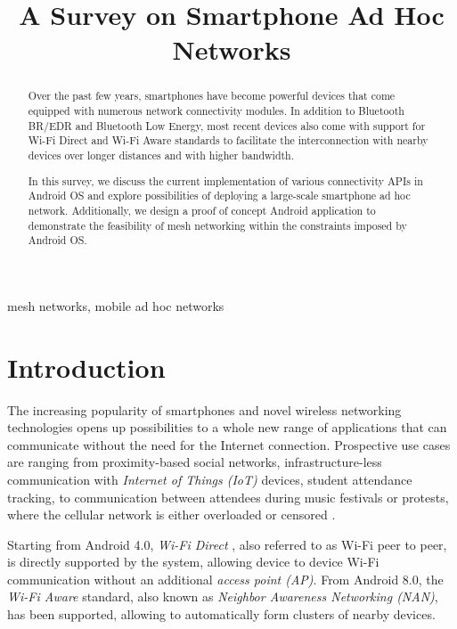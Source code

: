 \documentclass[conference,compsoc]{IEEEtran}
\begin{document}
 
\title{A Survey on Smartphone Ad Hoc Networks}

\author{
}

\maketitle

\begin{abstract}
Over the past few years, smartphones have become powerful devices that come equipped with numerous network connectivity modules. In addition to Bluetooth BR/EDR and Bluetooth Low Energy, most recent devices also come with support for Wi-Fi Direct and Wi-Fi Aware standards to facilitate the interconnection with nearby devices over longer distances and with higher bandwidth. 

In this survey, we discuss the current implementation of various connectivity APIs in Android OS and explore possibilities of deploying a large-scale smartphone ad hoc network. Additionally, we design a proof of concept Android application to demonstrate the feasibility of mesh networking within the constraints imposed by Android OS.

\end{abstract}

\begin{IEEEkeywords}mesh networks, mobile ad hoc networks\end{IEEEkeywords}

\section{Introduction}

The increasing popularity of smartphones and novel wireless networking technologies opens up possibilities to a whole new range of applications that can communicate without the need for the Internet connection. Prospective use cases are ranging from proximity-based social networks, infrastructure-less communication with \textit{Internet of Things (IoT)} devices, student attendance tracking, to communication between attendees during music festivals or protests, where the cellular network is either overloaded or censored \cite{forbes:hk}. 

Starting from Android 4.0, \textit{Wi-Fi Direct} \cite{android:wifip2p}, also referred to as Wi-Fi peer to peer, is directly supported by the system, allowing device to device Wi-Fi communication without an additional \textit{access point (AP)}. From Android 8.0, the \textit{Wi-Fi Aware} \cite{android:wifiaware} standard, also known as \textit{Neighbor Awareness Networking (NAN)}, has been supported, allowing to automatically form clusters of nearby devices.
\end{document}
